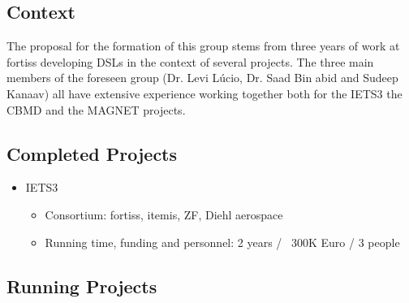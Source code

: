 \documentclass{article}
\begin{document}
\begin{appendices}
\section{Context}

The proposal for the formation of this group stems from three years of work at
fortiss developing DSLs in the context of several projects. The three main
members of the foreseen group (Dr. Levi L\'ucio, Dr.
Saad Bin abid and Sudeep Kanaav) all have extensive experience working together
both for the IETS3 the CBMD and the MAGNET projects.

\subsection{Completed Projects}

\begin{itemize}
  \item IETS3
  \begin{itemize}
    \item Consortium: fortiss, itemis, ZF, Diehl aerospace
    \item Running time, funding and personnel: 2 years / ~300K Euro / 3 people
  \end{itemize}
\end{itemize}

\subsection{Running Projects}
\label{section:running_projects}


\end{appendices}
\end{document}
